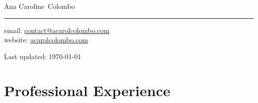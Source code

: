 \documentclass[11pt, a4paper]{article}
\makeatletter
\newcommand{\FirstName}{Ana Caroline}
\newcommand{\LastName}{Colombo}
\newcommand{\MyName}{\FirstName\ \LastName}
\newcommand{\Email}{contact@acarolcolombo.com}
\newcommand{\Website}{acarolcolombo.com}
\makeatother
\begin{document}
\thispagestyle{empty}


{\fontsize{20pt}{0}\selectfont \MyName}	\\[0.3cm]
\rule{\textwidth}{0.2pt}
\begin{minipage}[t]{0.595\textwidth}
	 email: \href{mailto:\Email}{\Email}
    \\
    website: \href{https://www.\Website}{\Website}
\end{minipage}
\begin{minipage}[t]{0.405\textwidth}
  \begin{flushright}
  Last updated: \monthyear\today
  \\
  \end{flushright}
\end{minipage}

\section*{Professional Experience}
\end{document}

